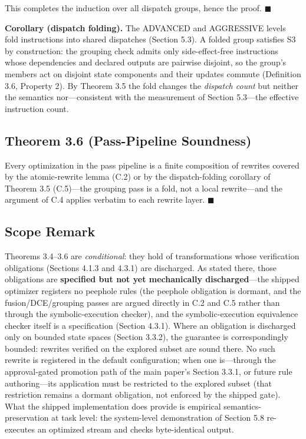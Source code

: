 \documentclass[
  11pt,
]{article}
\begin{document}
This completes the induction over all dispatch groups, hence the proof.
\(\blacksquare\)

\textbf{Corollary (dispatch folding).} The ADVANCED and AGGRESSIVE
levels fold instructions into shared dispatches (Section 5.3). A folded
group satisfies S3 by construction: the grouping check admits only
side-effect-free instructions whose dependencies and declared outputs
are pairwise disjoint, so the group's members act on disjoint state
components and their updates commute (Definition 3.6, Property 2). By
Theorem 3.5 the fold changes the \emph{dispatch count} but neither the
semantics nor---consistent with the measurement of Section 5.3---the
effective instruction count.

\subsection{Theorem 3.6 (Pass-Pipeline
Soundness)}\label{theorem-3.6-pass-pipeline-soundness}

Every optimization in the pass pipeline is a finite composition of
rewrites covered by the atomic-rewrite lemma (C.2) or by the
dispatch-folding corollary of Theorem 3.5 (C.5)---the grouping pass is a
fold, not a local rewrite---and the argument of C.4 applies verbatim to
each rewrite layer. \(\blacksquare\)

\subsection{Scope Remark}\label{scope-remark-1}

Theorems 3.4--3.6 are \emph{conditional}: they hold of transformations
whose verification obligations (Sections 4.1.3 and 4.3.1) are
discharged. As stated there, those obligations are \textbf{specified but
not yet mechanically discharged}---the shipped optimizer registers no
peephole rules (the peephole obligation is dormant, and the
fusion/DCE/grouping passes are argued directly in C.2 and C.5 rather
than through the symbolic-execution checker), and the symbolic-execution
equivalence checker itself is a specification (Section 4.3.1). Where an
obligation is discharged only on bounded state spaces (Section 3.3.2),
the guarantee is correspondingly bounded: rewrites verified on the
explored subset are sound there. No such rewrite is registered in the
default configuration; when one is---through the approval-gated
promotion path of the main paper's Section 3.3.1, or future rule
authoring---its application must be restricted to the explored subset
(that restriction remains a dormant obligation, not enforced by the
shipped gate). What the shipped implementation does provide is empirical
semantics-preservation at task level: the system-level demonstration of
Section 5.8 re-executes an optimized stream and checks byte-identical
output.
\end{document}
